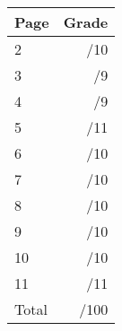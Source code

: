 \documentclass[12pt]{article}
\newcommand{\skipline}{\vspace{12pt}}
\begin{document}
\begin{table}[hbt]
\begin{center}
\begin{tabular}{|l|r|} \hline
Page&Grade\\
\hline \hline
\cline{1-2} 2 & \enspace\enspace\enspace\enspace\enspace\enspace/10\\
\cline{1-2} 3 & \enspace\enspace\enspace\enspace\enspace\enspace/9\\
\cline{1-2} 4 & \enspace\enspace\enspace\enspace\enspace\enspace/9\\
\cline{1-2} 5 & \enspace\enspace\enspace\enspace\enspace\enspace/11\\
\cline{1-2} 6 & \enspace\enspace\enspace\enspace\enspace\enspace/10\\
\cline{1-2} 7 & \enspace\enspace\enspace\enspace\enspace\enspace/10\\
\cline{1-2} 8 & \enspace\enspace\enspace\enspace\enspace\enspace/10\\
\cline{1-2} 9 & \enspace\enspace\enspace\enspace\enspace\enspace/10\\
\cline{1-2} 10 & \enspace\enspace\enspace\enspace\enspace\enspace/10\\
\cline{1-2} 11 & \enspace\enspace\enspace\enspace\enspace\enspace/11\\
\cline{1-2} Total & \enspace\enspace\enspace\enspace\enspace\enspace/100\\
\hline
\end{tabular}

\skipline

\skipline

\skipline


\end{center}
\end{table}
\newpage
\end{document}
